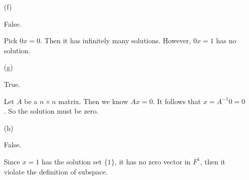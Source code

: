 \begin{Exercise}
\begin{enumerate}[(a)]
		\item[(f)]
		\begin{answer}
			False.
		\end{answer}
		\begin{solution}
			Pick $0x = 0$. Then it has infinitely many solutions. However, $0x = 1$ has no solution.
		\end{solution}
		
		\item[(g)]
		\begin{answer}
			True.
		\end{answer}
		\begin{solution}
			Let $A$ be a $n\times n$ matrix. Then we know $Ax = 0$. It follows that $x = A^{-1} 0 = 0$. So the solution must be zero.
		\end{solution}
		
		\item[(h)]
		\begin{answer}
			False.
		\end{answer}
		\begin{solution}
			Since $x = 1$ has the solution set $\{1\}$, it has no zero vector in $F^1$, then it violate the definition of subspace.
		\end{solution}
		
	\end{enumerate}
\end{Exercise}